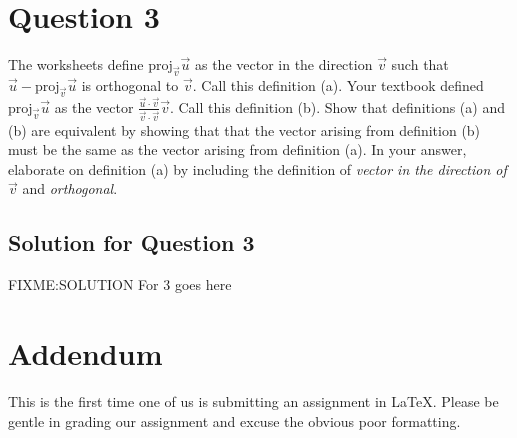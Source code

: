 \documentclass[letter]{article}
\newcommand{\Proj}{\mathrm{proj}}
\begin{document}
\section{Question 3}

The worksheets define $\Proj_{\vec v}\vec u$ as the vector in the direction $\vec v$ such that
      $\vec u-\Proj_{\vec v}\vec u$ is orthogonal to $\vec v$.  Call this definition (a).  Your textbook
      defined $\Proj_{\vec v}\vec u$ as the vector $\frac{\vec u\cdot \vec v}{\vec v\cdot\vec v}\vec v$.
      Call this definition (b).  Show that definitions (a) and (b) are equivalent by showing
      that that the vector arising from definition (b) must be the same as the vector
      arising from definition (a).
      In your answer, elaborate on definition (a) by including
      the definition of \emph{vector in the direction of $\vec v$} and \emph{orthogonal}.

\subsection{Solution for Question 3}
FIXME:SOLUTION For 3 goes here\\

\section{Addendum}
  This is the first time one of us is submitting an assignment in \LaTeX{}. Please be gentle in grading our assignment and excuse the obvious poor formatting.
\end{document}
